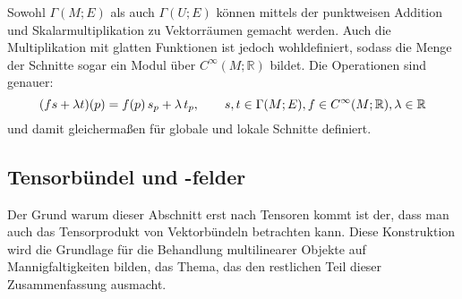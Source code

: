 \documentclass[../H_Analysis_main.tex]{subfiles}
\begin{document}

Sowohl $\Gamma(M; E)$ als auch $\Gamma(U; E)$ können mittels der punktweisen Addition und Skalarmultiplikation zu Vektorräumen gemacht werden. Auch die Multiplikation mit glatten Funktionen ist jedoch wohldefiniert, sodass die Menge der Schnitte sogar ein Modul über $C^\infty(M; \mathbb{R})$ bildet. Die Operationen sind genauer:
\begin{equation}
\qty(f s + \lambda t)(p) = f(p) \, s_p + \lambda \, t_p , \qquad s, t \in \Gamma(M; E), f \in C^\infty(M; \mathbb{R}), \lambda \in \mathbb{R}
\end{equation}
und damit gleichermaßen für globale und lokale Schnitte definiert. 



		\subsection{Tensorbündel und -felder}
Der Grund warum dieser Abschnitt erst nach Tensoren kommt ist der, dass man auch das Tensorprodukt von Vektorbündeln betrachten kann. Diese Konstruktion wird die Grundlage für die Behandlung multilinearer Objekte auf Mannigfaltigkeiten bilden, das Thema, das den restlichen Teil dieser Zusammenfassung ausmacht.
\end{document}
